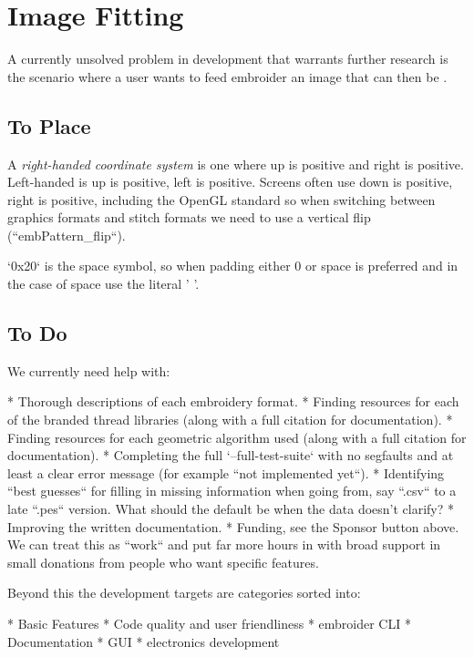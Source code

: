 \documentclass[a4paper]{report}
\begin{document}
\section{Image Fitting}

A currently unsolved problem in development that warrants further research is
the scenario where a user wants to feed embroider an image that can then be .

\subsection{To Place}

A \emph{right-handed coordinate system}
is one where up is positive and right is
positive. Left-handed is up is positive, left is positive. Screens often use
down is positive, right is positive, including the OpenGL standard so when
switching between graphics formats and stitch formats we need to use a vertical
flip (``embPattern\_flip``).

`0x20` is the space symbol, so when padding either 0 or space is preferred and
in the case of space use the literal ' '.

\subsection{To Do}

We currently need help with:

* Thorough descriptions of each embroidery format.
* Finding resources for each of the branded thread libraries (along with a
  full citation for documentation).
* Finding resources for each geometric algorithm used (along with a full
  citation for documentation).
* Completing the full `--full-test-suite` with no segfaults and at least a
  clear error message (for example ``not implemented yet``).
* Identifying ``best guesses`` for filling in missing information when going
  from, say ``.csv`` to a late ``.pes`` version. What should the default be when
  the data doesn't clarify?
* Improving the written documentation.
* Funding, see the Sponsor button above. We can treat this as ``work`` and
  put far more hours in with broad support in small donations from people who want
  specific features.

Beyond this the development targets are categories sorted into:

* Basic Features
* Code quality and user friendliness
* embroider CLI
* Documentation
* GUI
* electronics development
\end{document}
